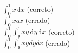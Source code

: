 
$\int_0^1 x \, \mathrm{d}x$ (correto) \\
$\int_0^1 x dx$ (errado) \\
$\int_0^1 \int_0^1 x y \, \mathrm{d} y \, \mathrm{d}x$ (correto) \\
$\int_0^1 \int_0^1 x y dy dx$ (errado)
